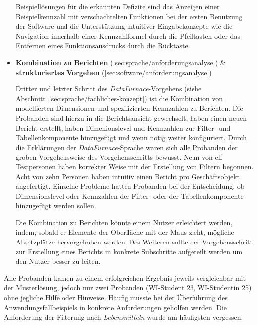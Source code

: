 \documentclass[
  language=german, %
  type=bachelor,%
  ngerman
]{isthesis}
\begin{document}
\begin{content}
\begin{itemize}
    Beispiellösungen für die erkannten Defizite sind das Anzeigen einer
    Beispielkennzahl mit verschachtelten Funktionen bei der ersten Benutzung
    der Software und die Unterstützung intuitiver Eingabekonzepte wie die
    Navigation innerhalb einer Kennzahlformel durch die Pfeiltasten oder
    das Entfernen eines Funktionsausdrucks durch die Rücktaste.

  \item \textbf{Kombination zu Berichten} (\ref{sec:sprache/anforderungsanalyse}) \& \textbf{strukturiertes Vorgehen} (\ref{sec:software/anforderungsanalyse})

    Dritter und letzter Schritt des \textit{DataFurnace}-Vorgehens (siehe
    Abschnitt~\ref{sec:sprache/fachliches-konzept}) ist die Kombination von
    modellierten Dimensionen und spezifizierten Kennzahlen zu Berichten. Die
    Probanden sind hierzu in die Berichtsansicht gewechselt, haben einen neuen
    Bericht erstellt, haben Dimenionslevel und Kennzahlen zur Filter- und
    Tabellenkomponente hinzugefügt und wenn nötig weiter konfiguriert. Durch
    die Erklärungen der \textit{DataFurnace}-Sprache waren sich alle Probanden
    der groben Vorgehensweise des Vorgehensschritts bewusst. Neun von elf
    Testpersonen haben korrekter Weise mit der Erstellung von Filtern begonnen.
    Acht von zehn Personen haben intuitiv einen Bericht pro Geschäftsobjekt
    angefertigt.  Einzelne Probleme hatten Probanden bei der Entscheidung, ob
    Dimensionslevel oder Kennzahlen der Filter- oder der Tabellenkomponente
    hinzugefügt werden sollen. 

    Die Kombination zu Berichten könnte einem Nutzer erleichtert werden, indem,
    sobald er Elemente der Oberfläche mit der Maus zieht, mögliche Absetzplätze
    hervorgehoben werden. Des Weiteren sollte der Vorgehensschritt zur Erstellung
    eines Berichts in konkrete Subschritte aufgeteilt werden um den Nutzer
    besser zu leiten.


\end{itemize}

Alle Probanden kamen zu einem erfolgreichen Ergebnis jeweils vergleichbar mit
der Musterlösung, jedoch nur zwei Probanden (WI-Student 23, WI-Studentin 25)
ohne jegliche Hilfe oder Hinweise. Häufig musste bei der Überführung des
Anwendungsfallbeispiels in konkrete Anforderungen geholfen werden. Die
Anforderung der Filterung nach \textit{Lebensmitteln} wurde am häufigsten
vergessen.




\end{content}
\end{document}
